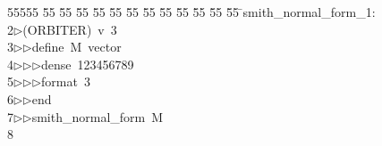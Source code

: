 %
%
\begin{tabbing}
55555 \= 55 \= 55 \= 55 \= 55 \= 55 \= 55 \= 55 \= 55 \= 55 \= 55 \= 55 \= 55 \= \>smith\_normal\_form\_1:\\[0pt]
2\>$\triangleright$\>(ORBITER)\ v\ 3\ \\[0pt]
3\>$\triangleright$\>$\triangleright$\>define\ M\ vector\ \\[0pt]
4\>$\triangleright$\>$\triangleright$\>$\triangleright$\>dense\ 123456789\ \\[0pt]
5\>$\triangleright$\>$\triangleright$\>$\triangleright$\>format\ 3\ \\[0pt]
6\>$\triangleright$\>$\triangleright$\>end\ \\[0pt]
7\>$\triangleright$\>$\triangleright$\>smith\_normal\_form\ M\\[0pt]
8\>\end{tabbing}
